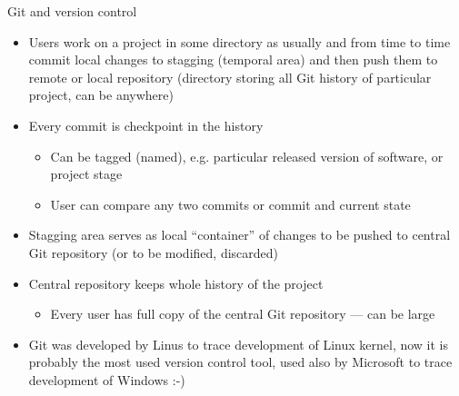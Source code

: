 \documentclass[compress, ucs, xelatex, 11pt, xcolor=svgnames, aspectratio=169,
	hyperref={
		bookmarks=true,
		unicode=true,
		colorlinks=true,
		pdftitle={Linux, command line and MetaCentrum},
		plainpages=false,
		pdfauthor={Vojtech Zeisek},
		pdfsubject={Course about use of Linux command line, writing shell scripts and using MetaCentrum of CESNET},
		pdfcreator={XeLaTeX},
		pdfkeywords={Linux, GNU, BASH, shell, command line, MetaCentrum},
		linkcolor=DarkRed, %
		anchorcolor=DarkBlue, %
		citecolor=Indigo, %
		filecolor=NavyBlue, %
		menucolor=DarkMagenta, %
		urlcolor=DarkBlue, %
		pdftex},
	url={hyphens, lowtilde} %
	]{beamer}
\begin{document}
\begin{frame}[allowframebreaks]{Git and version control}
\begin{itemize}
\begin{itemize}
		\end{itemize}
		\item Users work on a project in some directory as usually and from time to time commit local changes to stagging (temporal area) and then push them to remote or local repository (directory storing all Git history of particular project, can be anywhere)
		\item Every commit is checkpoint in the history
		\begin{itemize}
			\item Can be tagged (named), e.g. particular released version of software, or project stage
			\item User can compare any two commits or commit and current state
		\end{itemize}
		\item Stagging area serves as local \enquote{container} of changes to be pushed to central Git repository (or to be modified, discarded)
		\item Central repository keeps whole history of the project
		\begin{itemize}
			\item Every user has full copy of the central Git repository --- can be large
		\end{itemize}
		\item Git was developed by Linus to trace development of Linux kernel, now it is probably the most used version control tool, used also by Microsoft to trace development of Windows :-)
	\end{itemize}
\end{frame}
\end{document}
